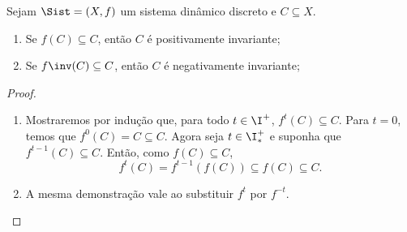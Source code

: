 \begin{proposition}\label{prop:inva.discre}
Sejam $\Sist=(X,f)$ um sistema dinâmico discreto e $C \subseteq X$.
	\begin{enumerate}
	\item Se $f(C) \subseteq C$, então $C$ é positivamente invariante;
	\item Se $f\inv(C) \subseteq C$, então $C$ é negativamente invariante;
	\end{enumerate}
\end{proposition}
\begin{proof}
	\begin{enumerate}
	\item Mostraremos por indução que, para todo $t \in \I^+$, $f^t(C) \subseteq C$. Para $t=0$, temos que $f^0(C) = C \subseteq C$. Agora seja $t \in \I^+_*$ e suponha que $f^{t-1}(C) \subseteq C$. Então, como $f(C) \subseteq C$,
		\begin{equation*}
		f^t(C) = f^{t-1}(f(C)) \subseteq f(C) \subseteq C.
		\end{equation*}

	\item A mesma demonstração vale ao substituir $f^t$ por $f^{-t}$.




	\end{enumerate}
\end{proof}

